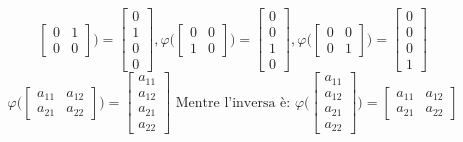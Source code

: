 \begin{example}
\begin{equation*}
\begin{bmatrix}
			0 & 1 \\
			0 & 0
		\end{bmatrix}
		\bigg)
		=
		\begin{bmatrix}
			0 \\ 1 \\ 0 \\ 0
		\end{bmatrix},
		\varphi \bigg(
		\begin{bmatrix}
			0 & 0 \\
			1 & 0
		\end{bmatrix}
		\bigg)
		=
		\begin{bmatrix}
			0 \\ 0 \\ 1 \\ 0
		\end{bmatrix},
		\varphi \bigg(
		\begin{bmatrix}
			0 & 0 \\
			0 & 1
		\end{bmatrix}
		\bigg)
		=
		\begin{bmatrix}
			0 \\ 0 \\ 0 \\ 1
		\end{bmatrix}
	\end{equation*}
	\begin{equation*}
		\varphi \bigg(
		\begin{bmatrix}
			a_{11} & a_{12} \\
			a_{21} & a_{22}
		\end{bmatrix}
		\bigg)
		=
		\begin{bmatrix}
			a_{11} \\ a_{12} \\
			a_{21} \\ a_{22}
		\end{bmatrix}
		\text{ Mentre l'inversa è: }
		\varphi \bigg(
		\begin{bmatrix}
			a_{11} \\ a_{12} \\
			a_{21} \\ a_{22}
		\end{bmatrix}
		\bigg)
		=
		\begin{bmatrix}
			a_{11} & a_{12} \\
			a_{21} & a_{22}
		\end{bmatrix}
	\end{equation*}
\end{example}
